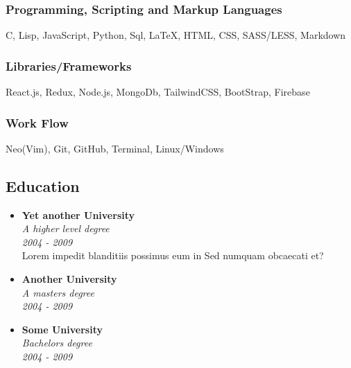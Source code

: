 \documentclass[11pt, oneside, a4paper, titlepage]{article}
\begin{document}
\begin{tcolorbox}
\begin{minipage}[t]{8cm}
\begin{tcolorbox}[grow to left by=0.6cm,colback=gray!25,colframe=white]
        \subsubsection{Programming, Scripting and Markup Languages}
        C, Lisp, JavaScript, Python, Sql, {\LaTeX}, HTML, CSS, SASS/LESS, Markdown

        \subsubsection{Libraries/Frameworks}
        React.js, Redux, Node.js, MongoDb, TailwindCSS, BootStrap, Firebase

        \subsubsection{Work Flow}
        Neo(Vim), Git, GitHub, Terminal, Linux/Windows
    \end{tcolorbox}
  \end{minipage}

  \begin{minipage}[t]{10cm}
    \vspace*{-0.5cm}
    \begin{tcolorbox}[grow to right by=0.75cm,colframe=white,colback=white]
      \section*{Education}
      \begin{itemize}
        \item
        {
          \textbf{Yet another University} \\
          \emph{A higher level degree} \\
          \emph{2004 - 2009} \\
          Lorem impedit blanditiis possimus eum in Sed numquam obcaecati et?
        }
        \item
        {
          \textbf{Another University} \\
          \emph{A masters degree} \\
          \emph{2004 - 2009} \\
        }
        \item
        {
          \textbf{Some University} \\
          \emph{Bachelors degree} \\
          \emph{2004 - 2009} \\
        }
      \end{itemize}
    \end{tcolorbox}
  \end{minipage}
\end{tcolorbox}
\end{document}
